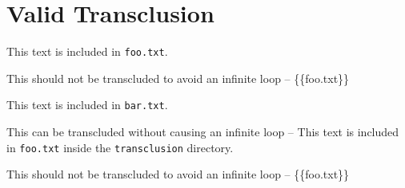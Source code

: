 
\def\mytitle{MultiMarkdown Transclusion Test}


\part{Valid Transclusion}
\label{validtransclusion}

This text is included in \texttt{foo.txt}.

This should not be transcluded to avoid an infinite loop -- \{\{foo.txt\}\}

This text is included in \texttt{bar.txt}.

This can be transcluded without causing an infinite loop -- This text is included in \texttt{foo.txt} inside the \texttt{transclusion} directory.

This should not be transcluded to avoid an infinite loop -- \{\{foo.txt\}\}




